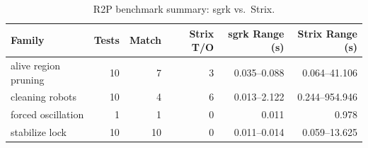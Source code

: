 \begin{table}[htbp]
\centering
\caption{R2P benchmark summary: sgrk vs.\ Strix.}
\label{tab:R2P_summary}
\begin{tabular}{l r r r r r}
\toprule
Family & Tests & Match & Strix T/O & sgrk Range (s) & Strix Range (s) \\
\midrule
alive region pruning & 10 & 7 & 3 & 0.035--0.088 & 0.064--41.106 \\
cleaning robots & 10 & 4 & 6 & 0.013--2.122 & 0.244--954.946 \\
forced oscillation & 1 & 1 & 0 & 0.011 & 0.978 \\
stabilize lock & 10 & 10 & 0 & 0.011--0.014 & 0.059--13.625 \\
\bottomrule
\end{tabular}
\end{table}
